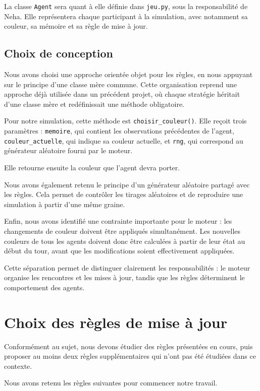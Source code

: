 \documentclass[12pt,a4paper]{article}
\begin{document}
La classe \texttt{Agent} sera quant à elle définie dans
\texttt{jeu.py}, sous la responsabilité de Neha. Elle représentera
chaque participant à la simulation, avec notamment sa couleur,
sa mémoire et sa règle de mise à jour.

\subsection{Choix de conception}

Nous avons choisi une approche orientée objet pour les règles,
en nous appuyant sur le principe d'une classe mère commune.
Cette organisation reprend une approche déjà utilisée dans
un précédent projet, où chaque stratégie héritait d'une classe
mère et redéfinissait une méthode obligatoire.

Pour notre simulation, cette méthode est
\texttt{choisir\_couleur()}.
Elle reçoit trois paramètres :
\texttt{memoire}, qui contient les observations précédentes
de l'agent, \texttt{couleur\_actuelle}, qui indique sa couleur
actuelle, et \texttt{rng}, qui correspond au générateur
aléatoire fourni par le moteur.

Elle retourne ensuite la couleur que l'agent devra porter.

Nous avons également retenu le principe d'un générateur
aléatoire partagé avec les règles. Cela permet de contrôler
les tirages aléatoires et de reproduire une simulation à partir
d'une même graine.

Enfin, nous avons identifié une contrainte importante pour
le moteur : les changements de couleur doivent être appliqués
simultanément. Les nouvelles couleurs de tous les agents doivent
donc être calculées à partir de leur état au début du tour,
avant que les modifications soient effectivement appliquées.

Cette séparation permet de distinguer clairement les
responsabilités : le moteur organise les rencontres et les
mises à jour, tandis que les règles déterminent le comportement
des agents.

\section{Choix des règles de mise à jour}

Conformément au sujet, nous devons étudier des règles présentées
en cours, puis proposer au moins deux règles supplémentaires
qui n'ont pas été étudiées dans ce contexte.

Nous avons retenu les règles suivantes pour commencer notre
travail.
\end{document}
